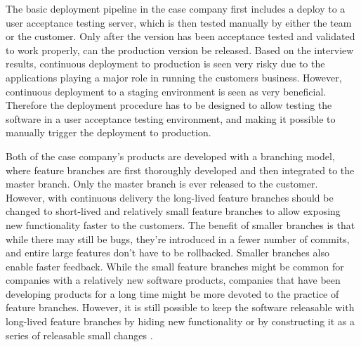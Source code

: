 \documentclass[english, grading]{tktltiki2}
\theoremstyle{definition}
\theoremstyle{remark}
\begin{document}
The basic deployment pipeline in the case company first includes a deploy to a user acceptance testing server, which is then tested manually by either the team or the customer. Only after the version has been acceptance tested and validated to work properly, can the production version be released. Based on the interview results, continuous deployment to production is seen very risky due to the applications playing a major role in running the customers business. However, continuous deployment to a staging environment is seen as very beneficial. Therefore the deployment procedure has to be designed to allow testing the software in a user acceptance testing environment, and making it possible to manually trigger the deployment to production.

Both of the case company's products are developed with a branching model, where feature branches are first thoroughly developed and then integrated to the master branch. Only the master branch is ever released to the customer. However, with continuous delivery the long-lived feature branches should be changed to short-lived and relatively small feature branches to allow exposing new functionality faster to the customers. The benefit of smaller branches is that while there may still be bugs, they're introduced in a fewer number of commits, and entire large features don't have to be rollbacked. Smaller branches also enable faster feedback. While the small feature branches might be common for companies with a relatively new software products, companies that have been developing products for a long time might be more devoted to the practice of feature branches. However, it is still possible to keep the software releasable with long-lived feature branches by hiding new functionality or by constructing it as a series of releasable small changes \cite{cdbook}.
\end{document}
